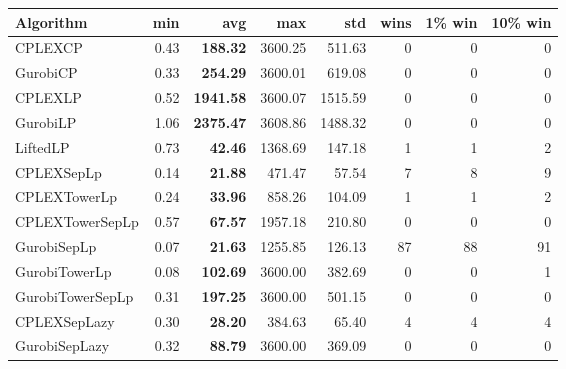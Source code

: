 \begin{tabular}{lrrrrrrr}
Algorithm & min & avg & max & std
& wins & 1\% win & 10\% win 
\\
\hline
CPLEXCP&0.43& \bf188.32& 3600.25& 511.63&0&0&0\\
GurobiCP&0.33& \bf254.29& 3600.01& 619.08&0&0&0\\
CPLEXLP&0.52& \bf1941.58& 3600.07& 1515.59&0&0&0\\
GurobiLP&1.06& \bf2375.47& 3608.86& 1488.32&0&0&0\\
LiftedLP&0.73& \bf42.46& 1368.69& 147.18&1&1&2\\
CPLEXSepLp&0.14& \bf21.88& 471.47& 57.54&7&8&9\\
CPLEXTowerLp&0.24& \bf33.96& 858.26& 104.09&1&1&2\\
CPLEXTowerSepLp&0.57& \bf67.57& 1957.18& 210.80&0&0&0\\
GurobiSepLp&0.07& \bf21.63& 1255.85& 126.13&87&88&91\\
GurobiTowerLp&0.08& \bf102.69& 3600.00& 382.69&0&0&1\\
GurobiTowerSepLp&0.31& \bf197.25& 3600.00& 501.15&0&0&0\\
CPLEXSepLazy&0.30& \bf28.20& 384.63& 65.40&4&4&4\\
GurobiSepLazy&0.32& \bf88.79& 3600.00& 369.09&0&0&0
\end{tabular}
